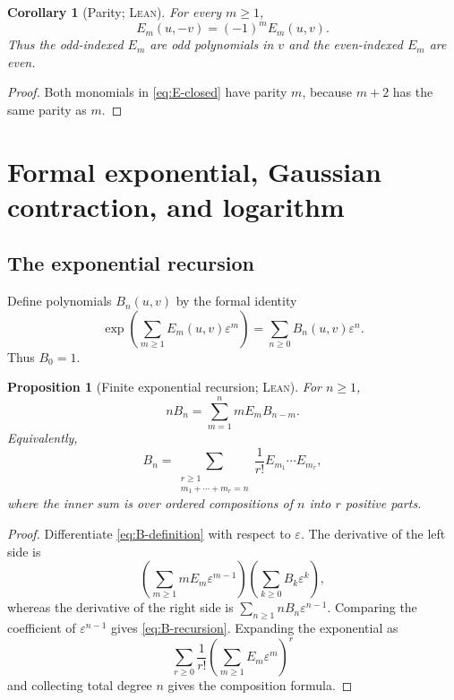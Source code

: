 \documentclass[11pt,oneside]{article}
\newtheorem{proposition}[theorem]{Proposition}
\newtheorem{corollary}[theorem]{Corollary}
\theoremstyle{definition}
\theoremstyle{remark}
\newcommand{\Formalized}{\textsc{Lean}}
\begin{document}
\begin{corollary}[Parity; \Formalized]
\label{cor:E-parity}
For every $m\geq1$,
\[
 E_m(u,-v)=(-1)^mE_m(u,v).
\]
Thus the odd-indexed $E_m$ are odd polynomials in $v$ and the
even-indexed $E_m$ are even.
\end{corollary}

\begin{proof}
Both monomials in \eqref{eq:E-closed} have parity $m$, because $m+2$ has
the same parity as $m$.
\end{proof}

\section{Formal exponential, Gaussian contraction, and logarithm}
\label{sec:coefficient-formulas}

\subsection{The exponential recursion}

Define polynomials $B_n(u,v)$ by the formal identity
\begin{equation}
 \exp\!\left(\sum_{m\geq1}E_m(u,v)\varepsilon^m\right)
 =\sum_{n\geq0}B_n(u,v)\varepsilon^n.
 \label{eq:B-definition}
\end{equation}
Thus $B_0=1$.

\begin{proposition}[Finite exponential recursion; \Formalized]
\label{prop:exp-recursion}
For $n\geq1$,
\begin{equation}
 nB_n=\sum_{m=1}^n mE_mB_{n-m}. \label{eq:B-recursion}
\end{equation}
Equivalently,
\[
 B_n=\sum_{\substack{r\geq1\\m_1+\cdots+m_r=n}}
 \frac1{r!}E_{m_1}\cdots E_{m_r},
\]
where the inner sum is over ordered compositions of $n$ into $r$ positive
parts.
\end{proposition}

\begin{proof}
Differentiate \eqref{eq:B-definition} with respect to $\varepsilon$.
The derivative of the left side is
\[
 \left(\sum_{m\geq1}mE_m\varepsilon^{m-1}\right)
 \left(\sum_{k\geq0}B_k\varepsilon^k\right),
\]
whereas the derivative of the right side is
$\sum_{n\geq1}nB_n\varepsilon^{n-1}$.  Comparing the coefficient of
$\varepsilon^{n-1}$ gives \eqref{eq:B-recursion}.  Expanding the
exponential as
\[
 \sum_{r\geq0}\frac1{r!}
 \left(\sum_{m\geq1}E_m\varepsilon^m\right)^r
\]
and collecting total degree $n$ gives the composition formula.
\end{proof}
\end{document}
